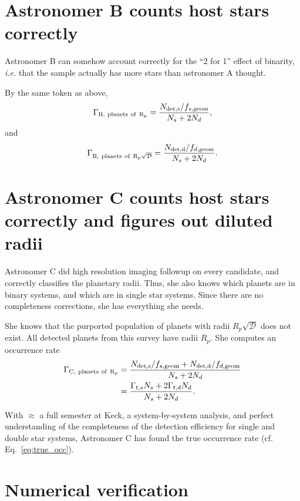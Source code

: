 \documentclass{emulateapj}
\begin{document}
\section{Astronomer B counts host stars correctly}
Astronomer B can somehow account correctly for the ``2 for 1'' 
effect of binarity, \textit{i.e.} that the sample actually has more stars than 
astronomer A thought.

By the same token as above,
\begin{equation}
\Gamma_{\rm B,\ planets\ of\ R_p} = \frac{N_{\rm det,s}/f_{s,{\rm geom}}}{N_s + 
2N_d},
\end{equation}
and
\begin{equation}
\Gamma_{\rm B,\ planets\ of\ R_p \sqrt{\mathcal{D}}} = \frac{N_{\rm 
det,d}/f_{d,{\rm geom}}}{N_s 
	+ 2N_d}.
\end{equation}



\section{Astronomer C counts host stars correctly and figures out diluted radii}
Astronomer C did high resolution imaging followup on every candidate, and 
correctly classifies the planetary radii.
Thus, she also knows which planets are in binary systems, and which are in 
single star systems.
Since there are no completeness corrections, she has everything she needs.

She knows that the purported population of planets with radii $R_p 
\sqrt{\mathcal{D}}$ does not exist. All detected planets from this survey have 
radii $R_p$. She computes an occurrence rate
\begin{align}
\Gamma_{\rm C,\ planets\ of\ R_p} &= 
\frac{N_{\rm det,s}/f_{s,{\rm geom}} + N_{\rm det,d}/f_{d,{\rm geom}}}{N_s + 
2N_d} \\
&= \frac{\Gamma_{t,s} N_s + 2\Gamma_{t,d} N_d}{N_s + 2 N_d}.
\end{align}

With $\approx$ a full semester at Keck, a system-by-system analysis, 
and perfect understanding of the completeness of the detection efficiency for 
single and double star systems, Astronomer C has found the true occurrence rate 
(cf. Eq.~\ref{eq:true_occ}).




\section{Numerical verification}
\end{document}
